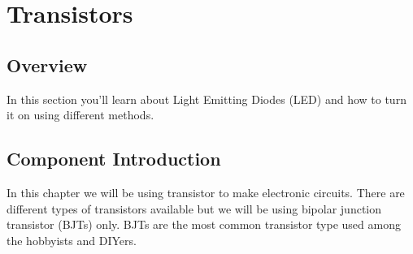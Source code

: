 
\chapter{Transistors}

\section{Overview}
In this section you'll learn about Light Emitting Diodes (LED) and how to turn it on using different methods.

\section{Component Introduction}
In this chapter we will be using transistor to make electronic circuits. There are different types of transistors available but we will be using bipolar junction transistor (BJTs) only. BJTs are the most common transistor type used among the hobbyists and DIYers.

